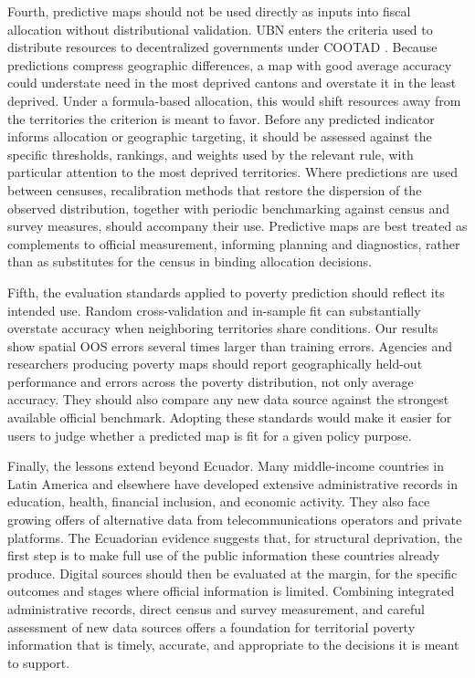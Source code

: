 \documentclass[pdflatex,sn-apa]{sn-jnl}
\begin{document}
Fourth, predictive maps should not be used directly as inputs into fiscal allocation without distributional validation. UBN enters the criteria used to distribute resources to decentralized governments under COOTAD \citep{COOTAD2010}. Because predictions compress geographic differences, a map with good average accuracy could understate need in the most deprived cantons and overstate it in the least deprived. Under a formula-based allocation, this would shift resources away from the territories the criterion is meant to favor. Before any predicted indicator informs allocation or geographic targeting, it should be assessed against the specific thresholds, rankings, and weights used by the relevant rule, with particular attention to the most deprived territories. Where predictions are used between censuses, recalibration methods that restore the dispersion of the observed distribution, together with periodic benchmarking against census and survey measures, should accompany their use. Predictive maps are best treated as complements to official measurement, informing planning and diagnostics, rather than as substitutes for the census in binding allocation decisions.

Fifth, the evaluation standards applied to poverty prediction should reflect its intended use. Random cross-validation and in-sample fit can substantially overstate accuracy when neighboring territories share conditions. Our results show spatial OOS errors several times larger than training errors. Agencies and researchers producing poverty maps should report geographically held-out performance and errors across the poverty distribution, not only average accuracy. They should also compare any new data source against the strongest available official benchmark. Adopting these standards would make it easier for users to judge whether a predicted map is fit for a given policy purpose.

Finally, the lessons extend beyond Ecuador. Many middle-income countries in Latin America and elsewhere have developed extensive administrative records in education, health, financial inclusion, and economic activity. They also face growing offers of alternative data from telecommunications operators and private platforms. The Ecuadorian evidence suggests that, for structural deprivation, the first step is to make full use of the public information these countries already produce. Digital sources should then be evaluated at the margin, for the specific outcomes and stages where official information is limited. Combining integrated administrative records, direct census and survey measurement, and careful assessment of new data sources offers a foundation for territorial poverty information that is timely, accurate, and appropriate to the decisions it is meant to support.
\end{document}

